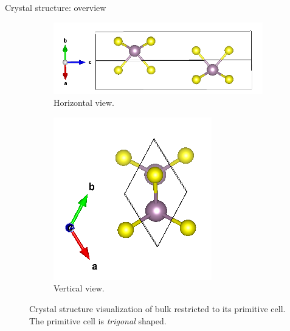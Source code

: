 \documentclass[dvipsnames]{beamer}
\begin{document}
	    \begin{frame}{Crystal structure: overview  \cite{osti_1202268}}
	        \begin{figure}
	        \centering
	        \begin{subfigure}{0.65\textwidth}
	        \includegraphics[scale=0.3]{MoS2_horizonthal.png}
	        \caption{Horizontal view.}
	        \end{subfigure}
	        \begin{subfigure}{0.3\textwidth}
	        \includegraphics[width=\textwidth]{MoS2_vertical.png}
	        \caption{Vertical view.}
	        \end{subfigure}
	        \caption{Crystal structure visualization of bulk  restricted to its primitive cell. The primitive cell is \textit{trigonal} shaped. \cite{vesta}}
	        \end{figure}
	    \end{frame}
	    
\end{document}
